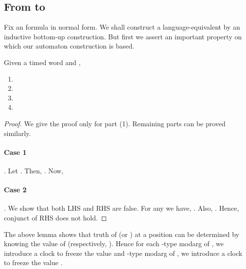 \documentclass{llncs}
\newcommand{\potdta}{\mbox{}}
\newcommand{\mitlfpinf}{\mbox{}}
\begin{document}
\subsection{From \mitlfpinf\/ to \potdta}
Fix an \mitlfpinf\/ formula  in normal form. We shall construct a language-equivalent \potdta\/  by an inductive bottom-up construction. But first we assert an important property on which our automaton construction is based. \begin{lemma}\label{lem:inftychar} Given a timed word  and ,
\begin{enumerate}
 \item  
 \item  
 \item  
 \item  
\end{enumerate}
\end{lemma}
\begin{proof} We give the proof only for part (1). Remaining parts can be proved similarly.
\paragraph{Case 1} . Let .
Then, . Now, \\

\paragraph{Case 2} . We show that both LHS and RHS are false. For any  we have,  . Also, . Hence,  conjunct  of RHS does not hold.
\end{proof}


The above lemma shows that truth of  (or ) at a position can be determined by knowing the value of  (respectively, ). Hence for each -type modarg  of , we introduce a clock  to freeze the value  and -type modarg  of , we introduce a clock  to freeze the value .
\end{document}
